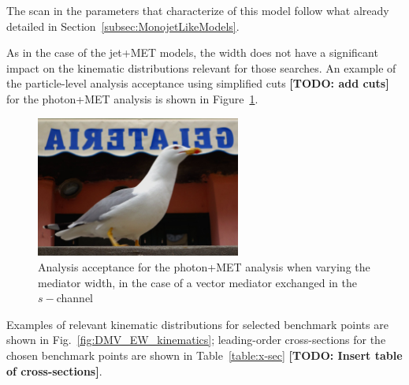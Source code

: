 The scan in the parameters that characterize of this model follow what
already detailed in Section~\ref{subsec:MonojetLikeModels}. 


As in the case of the jet+MET models, the width does not have a significant
impact on the kinematic distributions relevant for those searches. An example
of the particle-level analysis acceptance using simplified cuts \textbf{[TODO: add cuts]}
for the photon+MET analysis is shown in Figure~\ref{fig:DMV_EW_gamma_acceptance}.

\begin{figure}
    \includegraphics[width=0.6\textwidth]{figures/llug}
    \caption{Analysis acceptance for the photon+MET analysis when varying the mediator width, in the
    case of a vector mediator exchanged in the $s-$channel}
    \label{fig:DMV_EW_gamma_acceptance}
\end{figure}

Examples of relevant kinematic distributions for selected benchmark points are
shown in Fig.~\ref{fig:DMV_EW_kinematics}; leading-order cross-sections for the chosen 
benchmark points are shown in Table~\ref{table:x-sec}
\textbf{[TODO: Insert table of cross-sections]}.

